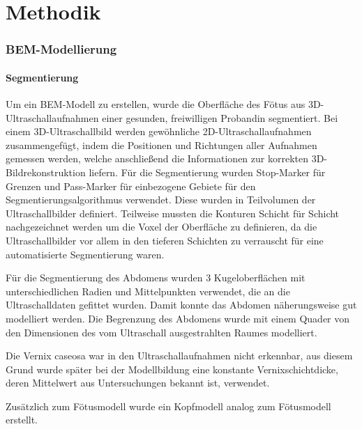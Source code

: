 \chapter{Methodik}
\subsection{BEM-Modellierung}
\subsubsection{Segmentierung}
Um ein BEM-Modell zu erstellen, wurde die Oberfläche des Fötus aus
3D-Ultraschallaufnahmen einer gesunden, freiwilligen Probandin
segmentiert. Bei einem 3D-Ultraschallbild werden gewöhnliche
2D-Ultraschallaufnahmen zusammengefügt, indem die Positionen und
Richtungen aller Aufnahmen gemessen werden, welche anschließend die
Informationen zur korrekten 3D-Bildrekonstruktion liefern. Für die
Segmentierung wurden Stop-Marker für Grenzen und Pass-Marker für
einbezogene Gebiete für den Segmentierungsalgorithmus verwendet. Diese
wurden in Teilvolumen der Ultraschallbilder definiert. Teilweise
mussten die Konturen Schicht für Schicht nachgezeichnet werden um die
Voxel der Oberfläche zu definieren, da die Ultraschallbilder vor allem
in den tieferen Schichten zu verrauscht für eine automatisierte
Segmentierung waren.

Für die Segmentierung des Abdomens wurden 3 Kugeloberflächen mit
unterschiedlichen Radien und Mittelpunkten verwendet, die an die
Ultraschalldaten gefittet wurden. Damit konnte das Abdomen
näherungsweise gut modelliert werden. Die Begrenzung des Abdomens wurde
mit einem Quader von den Dimensionen des vom Ultraschall ausgestrahlten
Raumes modelliert. 

Die Vernix caseosa war in den Ultraschallaufnahmen nicht erkennbar, aus
diesem Grund wurde später bei der Modellbildung eine konstante
Vernixschichtdicke, deren Mittelwert aus Untersuchungen bekannt ist,
verwendet.

Zusätzlich zum Fötusmodell wurde ein Kopfmodell analog zum Fötusmodell
erstellt.

